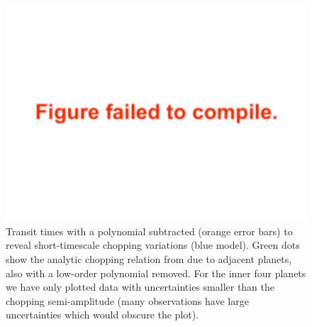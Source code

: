 \documentclass[twocolumn]{aastex63}
\begin{document}
\begin{figure}
    \centering
    \includegraphics[width=\hsize]{figures/T1_chopping.pdf}
    {Transit times with a polynomial subtracted (orange error bars) to reveal short-timescale chopping variations (blue model).  Green dots show the analytic chopping relation from \citet{Deck2015} due to adjacent planets, also with a low-order polynomial removed. For the inner four planets we have
        only plotted data with
        uncertainties smaller than the chopping semi-amplitude  (many observations have large uncertainties which would obscure the plot).}
    \label{fig:chopping}
\end{figure}
\end{document}
